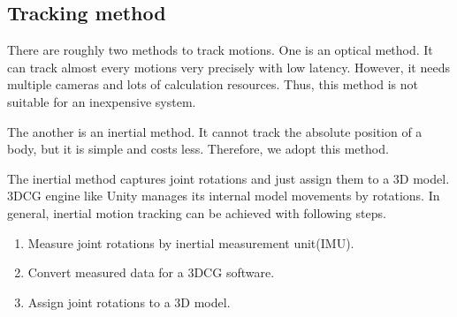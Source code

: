 \documentclass[journal]{IEEEtran}
\begin{document}
\subsection{Tracking method}
There are roughly two methods to track motions.
One is an optical method.
It can track almost every motions very precisely with low latency.
However, it needs multiple cameras and lots of calculation resources.
Thus, this method is not suitable for an inexpensive system.

The another is an inertial method.
It cannot track the absolute position of a body, but it is simple and costs less.
Therefore, we adopt this method.

The inertial method captures joint rotations and just assign them to a 3D model.
3DCG engine like Unity manages its internal model movements by rotations.
In general, inertial motion tracking can be achieved with following steps.
\begin{enumerate}
    \item Measure joint rotations by inertial measurement unit(IMU).
    \item Convert measured data for a 3DCG software.
    \item Assign joint rotations to a 3D model.
\end{enumerate}
\end{document}
